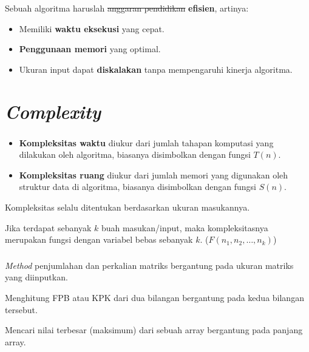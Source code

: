 \documentclass{../praktikum-ppt}
\begin{document}
\begin{frame}
  Sebuah algoritma haruslah \st{anggaran pendidikan} \textbf{efisien}, artinya:
  \begin{itemize}
    \item Memiliki \textbf{waktu eksekusi} yang cepat.
    \item \textbf{Penggunaan memori} yang optimal.
    \item Ukuran input dapat \textbf{diskalakan} tanpa mempengaruhi kinerja algoritma.
  \end{itemize}
\end{frame}

\section{\textit{Complexity}}
\begin{frame}
  \frametitle{\insertsection}
  \begin{itemize}
    \item \textbf{Kompleksitas waktu} diukur dari jumlah tahapan komputasi yang dilakukan oleh algoritma, biasanya disimbolkan dengan fungsi $T(n)$.
    \item \textbf{Kompleksitas ruang} diukur dari jumlah memori yang digunakan oleh struktur data di algoritma, biasanya disimbolkan dengan fungsi $S(n)$.
  \end{itemize}
  Kompleksitas selalu ditentukan berdasarkan ukuran masukannya.
  \begin{akibat}
    Jika terdapat sebanyak $k$ buah masukan/input, maka kompleksitasnya merupakan fungsi dengan variabel bebas sebanyak $k$. ($F(n_1, n_2, \ldots, n_k)$)
  \end{akibat}
\end{frame}

\begin{frame}
  \frametitle{\insertsection}
  \begin{contoh}
    \textit{Method} penjumlahan dan perkalian matriks bergantung pada ukuran matriks yang diinputkan.
  \end{contoh}
  \begin{contoh}
    Menghitung FPB atau KPK dari dua bilangan bergantung pada kedua bilangan tersebut.
  \end{contoh}
  \begin{contoh}
    Mencari nilai terbesar (maksimum) dari sebuah array bergantung pada panjang array.
  \end{contoh}
\end{frame}
\end{document}
